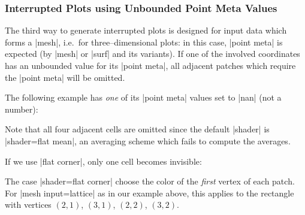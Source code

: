 {\subsubsection{Interrupted Plots using Unbounded Point Meta Values}
The third way to generate interrupted plots is designed for input data which forms a |mesh|, i.e.\ for three--dimensional plots: in this case, |point meta| is expected (by |mesh| or |surf| and its variants). If one of the involved coordinates has an unbounded value for its |point meta|, all adjacent patches which require the |point meta| will be omitted.

The following example has \emph{one} of its |point meta| values set to |nan| (not a number):
\begin{codeexample}[]
\end{codeexample}
Note that all four adjacent cells are omitted since the default |shader| is |shader=flat mean|, an averaging scheme which fails to compute the averages. 

If we use |flat corner|, only one cell becomes invisible:

\begin{codeexample}[]
\end{codeexample}

The case |shader=flat corner| choose the color of the \emph{first} vertex of each patch. For |mesh input=lattice| as in our example above, this applies to the rectangle with vertices $(2,1)$, $(3,1)$, $(2,2)$, $(3,2)$.

}
